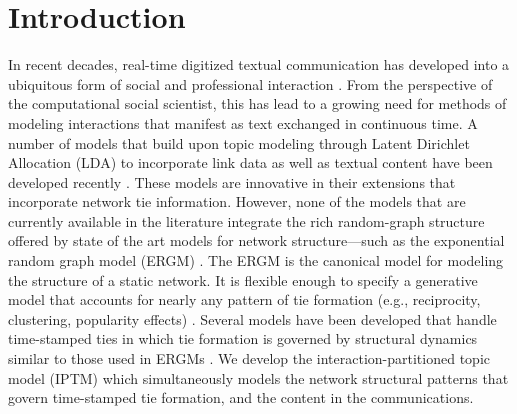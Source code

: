 \documentclass[ba]{imsart}
\numberwithin{equation}{section}
\theoremstyle{plain}
\begin{document}
	\section{Introduction}\label{sec:introduction}
In recent decades, real-time digitized textual communication has developed into a ubiquitous form of social and professional interaction \citep{kanungo2008modeling, szostek2011dealing, burgess2004email, pew2016}. From the perspective of the computational social scientist, this has lead to a growing need for methods of modeling interactions that manifest as text exchanged in continuous time. A number of models that build upon topic modeling through Latent Dirichlet Allocation (LDA) \citep{Blei2003} to incorporate link data as well as textual content have been developed recently \citep{mccallum2005author,lim2013twitter,Krafft2012}. These models are innovative in their extensions that incorporate network tie information. However, none of the models that are currently available in the literature integrate the rich random-graph structure offered by state of the art models for network structure---such as the exponential random graph model (ERGM) \citep{robins2007introduction,chatterjee2013estimating,hunter2008ergm}. The ERGM is the canonical model for modeling the structure of a static network. It is flexible enough to specify a generative model that accounts for nearly any pattern of tie formation (e.g., reciprocity, clustering, popularity effects) \citep{desmarais2017statistical}. Several models have been developed that handle time-stamped ties in which tie formation is governed by structural dynamics similar to those used in ERGMs \citep{PerryWolfe2012,Butts2008,snijders1996stochastic}. We develop the interaction-partitioned topic model (IPTM) which simultaneously models the network structural patterns that govern time-stamped tie formation, and the content in the communications.~
\end{document}
